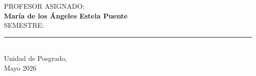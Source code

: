 \begin{titlepage}
{\normalsize PROFESOR ASIGNADO:}\\[0.2cm]
{\normalsize\textbf{María de los Ángeles Estela Puente}}\\[0.6cm]

{\normalsize SEMESTRE:}\\[0.2cm]
{\normalsize\textbf{\Semestre}}

\vfill

\noindent\rule{0.7\textwidth}{0.4pt}\\[0.3cm]
{\footnotesize Unidad de Posgrado, \Facultad}\\[0.1cm]
{\footnotesize \Ciudad \hfill Mayo 2026}

\end{titlepage}
